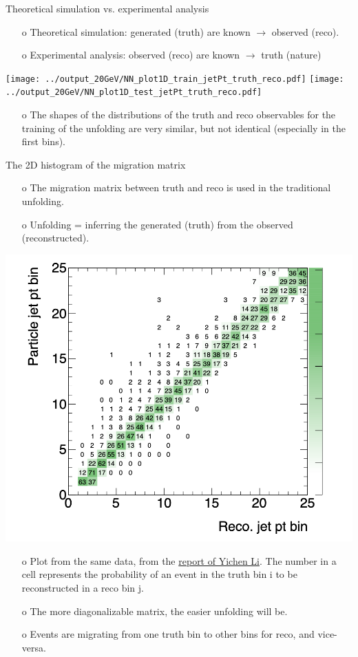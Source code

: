 \begin{frame} {Theoretical simulation vs. experimental analysis}
\begin{enumerate}
\item[o] Theoretical simulation: generated (truth) are known $\rightarrow$ observed (reco).
\item[o] Experimental analysis: observed (reco) are known $\rightarrow$ truth (nature)
\end{enumerate}
\centering
\texttt{[image: ../output\_20GeV/NN\_plot1D\_train\_jetPt\_truth\_reco.pdf]}
\texttt{[image: ../output\_20GeV/NN\_plot1D\_test\_jetPt\_truth\_reco.pdf]}
\begin{enumerate}
\item[o] The shapes of the distributions of the truth and reco observables for the training of the unfolding are very similar, but not identical (especially in the first bins). 
\end{enumerate}
\end{frame}
\clearpage


\begin{frame} {The 2D histogram of the migration matrix}
\begin{enumerate}
\item[o] The migration matrix between truth and reco is used in the traditional unfolding.
\item[o] Unfolding = inferring the generated (truth) from the observed (reconstructed).
\end{enumerate}
\centering
\includegraphics[height=0.42\textheight]{./plots/jetPt_migration_matrix.png}
\begin{enumerate}
\item[o] Plot from the same data, from the \href{http://www.desy.de/~liyichen/Unfolding.pdf}{report of Yichen Li}. The number in a cell represents the probability of an event in the truth bin i to be reconstructed in a reco bin j.
\item[o] The more diagonalizable matrix, the easier unfolding will be.
\item[o] Events are migrating from one truth bin to other bins for reco, and vice-versa.
\end{enumerate}
\end{frame}
\clearpage



